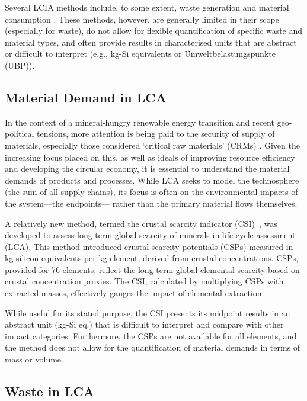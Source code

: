 Several LCIA methods include, to some extent, waste generation \citep{foen2021ecofactors,hauschild2003edip,cen2019en15804} and material consumption \citep{arvidsson2020csi,foen2021ecofactors}. These methods, however, are generally limited in their scope (especially for waste), do not allow for flexible quantification of specific waste and material types, and often provide results in characterised units that are abstract or difficult to interpret (e.g., kg-Si equivalents or Ümweltbelastungspunkte (UBP)).


\subsection{Material Demand in LCA}
In the context of a mineral-hungry renewable energy transition and recent geo-political tensions, more attention is being paid to the security of supply of materials, especially those considered `critical raw materials' (CRMs) \citep{eu2023crmstudy,hool2023crm,mancini2013supplysecurity,jrc2023supplychain,hartley2024cepolitics,salviulo2021supplychain}. Given the increasing focus placed on this, as well as ideals of improving resource efficiency and developing the circular economy, it is essential to understand the material demands of products and processes. While LCA seeks to model the technosphere (the sum of all supply chains), its focus is often on the environmental impacts of the system---the endpoints--- rather than the primary material flows themselves. 



A relatively new method, termed the crustal scarcity indicator (CSI)~\citep{arvidsson2020csi}, was developed to assess long-term global scarcity of minerals in life cycle assessment (LCA). This method introduced crustal scarcity potentials (CSPs) measured in kg silicon equivalents per kg element, derived from crustal concentrations. CSPs, provided for 76 elements, reflect the long-term global elemental scarcity based on crustal concentration proxies. The CSI, calculated by multiplying CSPs with extracted masses, effectively gauges the impact of elemental extraction. 

While useful for its stated purpose, the CSI presents its midpoint results in an abstract unit (kg-Si eq.) that is difficult to interpret and compare with other impact categories. Furthermore, the CSPs are not available for all elements, and the method does not allow for the quantification of material demands in terms of mass or volume.


\subsection{Waste in LCA}

